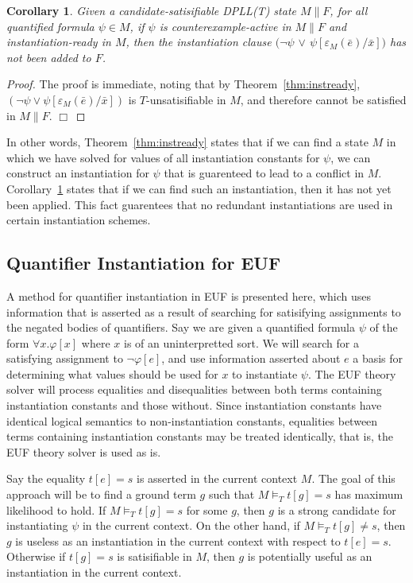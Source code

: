 \documentclass{llncs}
\newtheorem{cor}{Corollary}
\begin{document}
\begin{cor}
\label{cor:instready}
Given a candidate-satisifiable DPLL(T) state $M \parallel F$, for all quantified formula $\psi \in M$,
if $\psi$ is counterexample-active in $M \parallel F$ and instantiation-ready in $M$, then the instantiation clause $( \neg \psi$ $\vee$ $\psi[\varepsilon_{M}( \bar{e} )/\bar{x}])$ has not been added to $F$.
\end{cor}
\begin{proof}
The proof is immediate, noting that by Theorem~\ref{thm:instready}, $( \neg \psi \vee \psi[\varepsilon_{M}( \bar{e} )/\bar{x}])$ is $T$-unsatisifiable in $M$, and therefore cannot be satisfied in $M \parallel F$. $\Box$
\end{proof}

In other words, Theorem~\ref{thm:instready} states that if we can find a state $M$ in which we have solved for values of all instantiation constants for $\psi$, we can construct an instantiation for $\psi$ that is guarenteed to lead to a conflict in $M$.
Corollary~\ref{cor:instready} states that if we can find such an instantiation, then it has not yet been applied.
This fact guarentees that no redundant instantiations are used in certain instantiation schemes.

\subsection{Quantifier Instantiation for EUF}

A method for quantifier instantiation in EUF is presented here, which uses information that is asserted as a result of searching for satisifying assignments to the negated bodies of quantifiers.
Say we are given a quantified formula $\psi$ of the form $\forall x. \varphi[x]$ where $x$ is of an uninterpretted sort.
We will search for a satisfying assignment to $\neg \varphi[e]$, and use information asserted about $e$ a basis for determining what values should be used for $x$ to instantiate $\psi$.
The EUF theory solver will process equalities and disequalities between both terms containing instantiation constants and those without.
Since instantiation constants have identical logical semantics to non-instantiation constants, equalities between terms containing instantiation constants may be treated identically, that is, the EUF theory solver is used as is.

Say the equality $t[e] = s$ is asserted in the current context $M$.
The goal of this approach will be to find a ground term $g$ such that $M \models_T t[g] = s$ has maximum likelihood to hold.
If $M \models_T t[g] = s$ for some $g$, then $g$ is a strong candidate for instantiating $\psi$ in the current context.
On the other hand, if $M \models_T t[g] \neq s$, then $g$ is useless as an instantiation in the current context with respect to $t[e] = s$.
Otherwise if $t[g] = s$ is satisifiable in $M$, then $g$ is potentially useful as an instantiation in the current context.
\end{document}
